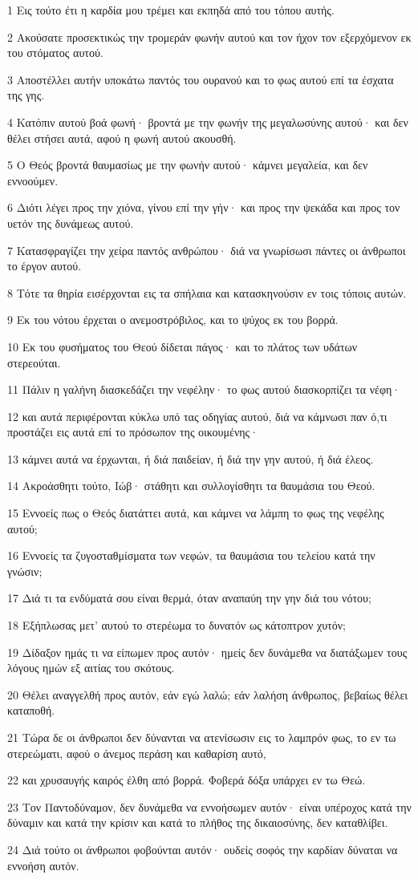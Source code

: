 \par 1 Εις τούτο έτι η καρδία μου τρέμει και εκπηδά από του τόπου αυτής.
\par 2 Ακούσατε προσεκτικώς την τρομεράν φωνήν αυτού και τον ήχον τον εξερχόμενον εκ του στόματος αυτού.
\par 3 Αποστέλλει αυτήν υποκάτω παντός του ουρανού και το φως αυτού επί τα έσχατα της γης.
\par 4 Κατόπιν αυτού βοά φωνή· βροντά με την φωνήν της μεγαλωσύνης αυτού· και δεν θέλει στήσει αυτά, αφού η φωνή αυτού ακουσθή.
\par 5 Ο Θεός βροντά θαυμασίως με την φωνήν αυτού· κάμνει μεγαλεία, και δεν εννοούμεν.
\par 6 Διότι λέγει προς την χιόνα, γίνου επί την γήν· και προς την ψεκάδα και προς τον υετόν της δυνάμεως αυτού.
\par 7 Κατασφραγίζει την χείρα παντός ανθρώπου· διά να γνωρίσωσι πάντες οι άνθρωποι το έργον αυτού.
\par 8 Τότε τα θηρία εισέρχονται εις τα σπήλαια και κατασκηνούσιν εν τοις τόποις αυτών.
\par 9 Εκ του νότου έρχεται ο ανεμοστρόβιλος, και το ψύχος εκ του βορρά.
\par 10 Εκ του φυσήματος του Θεού δίδεται πάγος· και το πλάτος των υδάτων στερεούται.
\par 11 Πάλιν η γαλήνη διασκεδάζει την νεφέλην· το φως αυτού διασκορπίζει τα νέφη·
\par 12 και αυτά περιφέρονται κύκλω υπό τας οδηγίας αυτού, διά να κάμνωσι παν ό,τι προστάζει εις αυτά επί το πρόσωπον της οικουμένης·
\par 13 κάμνει αυτά να έρχωνται, ή διά παιδείαν, ή διά την γην αυτού, ή διά έλεος.
\par 14 Ακροάσθητι τούτο, Ιώβ· στάθητι και συλλογίσθητι τα θαυμάσια του Θεού.
\par 15 Εννοείς πως ο Θεός διατάττει αυτά, και κάμνει να λάμπη το φως της νεφέλης αυτού;
\par 16 Εννοείς τα ζυγοσταθμίσματα των νεφών, τα θαυμάσια του τελείου κατά την γνώσιν;
\par 17 Διά τι τα ενδύματά σου είναι θερμά, όταν αναπαύη την γην διά του νότου;
\par 18 Εξήπλωσας μετ' αυτού το στερέωμα το δυνατόν ως κάτοπτρον χυτόν;
\par 19 Δίδαξον ημάς τι να είπωμεν προς αυτόν· ημείς δεν δυνάμεθα να διατάξωμεν τους λόγους ημών εξ αιτίας του σκότους.
\par 20 Θέλει αναγγελθή προς αυτόν, εάν εγώ λαλώ; εάν λαλήση άνθρωπος, βεβαίως θέλει καταποθή.
\par 21 Τώρα δε οι άνθρωποι δεν δύνανται να ατενίσωσιν εις το λαμπρόν φως, το εν τω στερεώματι, αφού ο άνεμος περάση και καθαρίση αυτό,
\par 22 και χρυσαυγής καιρός έλθη από βορρά. Φοβερά δόξα υπάρχει εν τω Θεώ.
\par 23 Τον Παντοδύναμον, δεν δυνάμεθα να εννοήσωμεν αυτόν· είναι υπέροχος κατά την δύναμιν και κατά την κρίσιν και κατά το πλήθος της δικαιοσύνης, δεν καταθλίβει.
\par 24 Διά τούτο οι άνθρωποι φοβούνται αυτόν· ουδείς σοφός την καρδίαν δύναται να εννοήση αυτόν.

